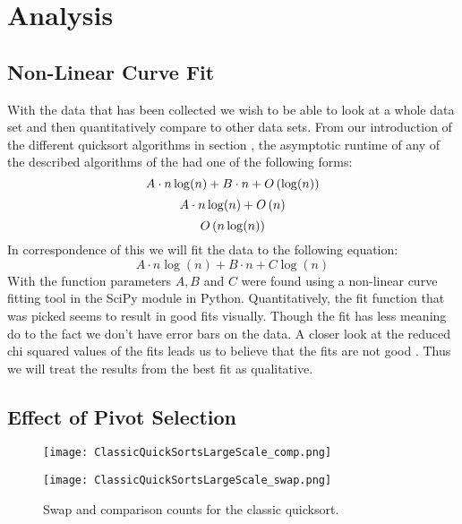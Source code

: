 \section{Analysis}
	\label{sec:Analysis}
	\subsection{Non-Linear Curve Fit}
		\label{subsec:CurveFit}

		With the data that has been collected we wish to be able to look at a whole data set and then quantitatively compare to other data sets. From our introduction of the different quicksort algorithms in section 	\label{sec:quicksortInto}, the asymptotic runtime of any of the described algorithms of the had one of the following forms:
		\begin{equation}
			A\cdot n\log(n) + B\cdot n + O\left(\log(n)\right)
		\end{equation}
		\begin{equation}
			A\cdot n\log(n) + O\left(n\right)
		\end{equation}
		\begin{equation}
			O\left(n\log(n)\right)
		\end{equation}
		In correspondence of this we will fit the data to the following equation:
		\begin{equation}
			A\cdot n\log(n) + B\cdot n + C\log(n)
			\label{eq:FitFunction}
		\end{equation}
		With the function parameters $A,B$ and $C$ were found using a non-linear curve fitting tool in the SciPy module in Python. Quantitatively, the fit function that was picked seems to result in good fits visually. Though the fit has less meaning do to the fact we don't have error bars on the data. A closer look at the reduced chi squared values of the fits leads us to believe that the fits are not good \cite{bevington1969data}. Thus we will treat the results from the best fit as qualitative.

	\subsection{Effect of Pivot Selection}
	\begin{figure}
		\centering
		\begin{minipage}{.5\textwidth}
		 	\centering
		 	\texttt{[image: ClassicQuickSortsLargeScale\_comp.png]}
		\end{minipage}%
		\begin{minipage}{.5\textwidth}
		 	\centering
		 	\texttt{[image: ClassicQuickSortsLargeScale\_swap.png]}
		\end{minipage}
		\caption{Swap and comparison counts for the classic quicksort.}
		\label{fig:classicSwapAndComp}
	\end{figure}

